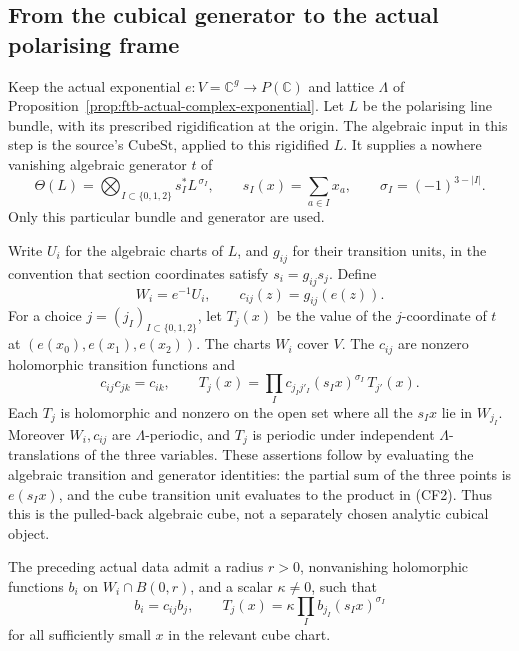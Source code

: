 \subsection{From the cubical generator to the actual polarising frame}
\label{subsec:ftb-cubical-complex-frame}

Keep the actual exponential \(e:V=\mathbb C^g\to P(\mathbb C)\) and
lattice \(\Lambda\) of
Proposition~\ref{prop:ftb-actual-complex-exponential}.
Let \(L\) be the polarising line bundle, with its prescribed
rigidification at the origin.  The algebraic input in this step is the
source's \(\mathrm{CubeSt}\), applied to this rigidified \(L\).
It supplies a nowhere vanishing algebraic generator \(t\) of
\[
 \Theta(L)=\bigotimes_{I\subset\{0,1,2\}}
              s_I^*L^{\,\sigma_I},\qquad
 s_I(x)=\sum_{a\in I}x_a,\qquad \sigma_I=(-1)^{3-|I|}.        \tag{CF1}
\]
Only this particular bundle and generator are used.

Write \(U_i\) for the algebraic charts of \(L\), and \(g_{ij}\) for their
transition units, in the convention that section coordinates satisfy
\(s_i=g_{ij}s_j\).  Define
\[
 W_i=e^{-1}U_i,\qquad c_{ij}(z)=g_{ij}(e(z)).
\]
For a choice \(j=(j_I)_{I\subset\{0,1,2\}}\), let \(T_j(x)\) be the value
of the \(j\)-coordinate of \(t\) at
\((e(x_0),e(x_1),e(x_2))\).  The charts \(W_i\) cover \(V\).
The \(c_{ij}\) are nonzero holomorphic transition functions and
\[
 c_{ij}c_{jk}=c_{ik},\qquad
 T_j(x)=\prod_I c_{j_Ij'_I}(s_Ix)^{\sigma_I}\,T_{j'}(x).    \tag{CF2}
\]
Each \(T_j\) is holomorphic and nonzero on the open set where all the
\(s_Ix\) lie in \(W_{j_I}\).  Moreover \(W_i,c_{ij}\) are
\(\Lambda\)-periodic, and \(T_j\) is periodic under independent
\(\Lambda\)-translations of the three variables.
These assertions follow by evaluating the algebraic transition and
generator identities: the partial sum of the three points is
\(e(s_Ix)\), and the cube transition unit evaluates to the product in
(CF2).  Thus this is the pulled-back algebraic cube, not a separately
chosen analytic cubical object.

\begin{srlemma}
\label{lem:ftb-cube-local-third-difference}
The preceding actual data admit a radius \(r>0\), nonvanishing
holomorphic functions \(b_i\) on \(W_i\cap B(0,r)\), and a scalar
\(\kappa\ne0\), such that
\[
 b_i=c_{ij}b_j,\qquad
 T_j(x)=\kappa\prod_I b_{j_I}(s_Ix)^{\sigma_I}                \tag{CF3}
\]
for all sufficiently small \(x\) in the relevant cube chart.
\end{srlemma}

